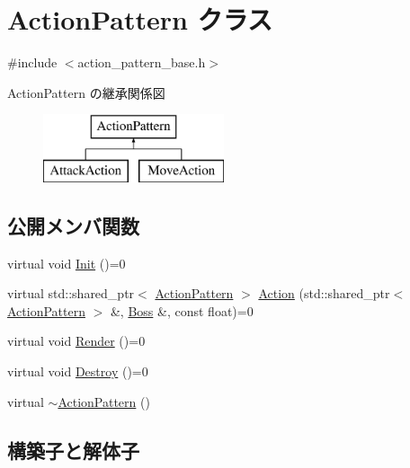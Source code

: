 \hypertarget{class_action_pattern}{}\section{Action\+Pattern クラス}
\label{class_action_pattern}


{\ttfamily \#include $<$action\+\_\+pattern\+\_\+base.\+h$>$}

Action\+Pattern の継承関係図\begin{figure}[H]
\begin{center}
\leavevmode
\includegraphics[height=2.000000cm]{class_action_pattern}
\end{center}
\end{figure}
\subsection*{公開メンバ関数}
\begin{DoxyCompactItemize}
\item 
virtual void \mbox{\hyperlink{class_action_pattern_ac8f2228ca469ce6fe29a9775bf393e0e}{Init}} ()=0
\item 
virtual std\+::shared\+\_\+ptr$<$ \mbox{\hyperlink{class_action_pattern}{Action\+Pattern}} $>$ \mbox{\hyperlink{class_action_pattern_a04c8daf0bf5e263303f7d86aec20eb27}{Action}} (std\+::shared\+\_\+ptr$<$ \mbox{\hyperlink{class_action_pattern}{Action\+Pattern}} $>$ \&, \mbox{\hyperlink{class_boss}{Boss}} \&, const float)=0
\item 
virtual void \mbox{\hyperlink{class_action_pattern_a313199aa5d15b6f9381b916ffe23fe6a}{Render}} ()=0
\item 
virtual void \mbox{\hyperlink{class_action_pattern_a73833df08867c4f4785ddf51344eca47}{Destroy}} ()=0
\item 
virtual \mbox{\hyperlink{class_action_pattern_a0549549b350f2a150835c07cb796131b}{$\sim$\+Action\+Pattern}} ()
\end{DoxyCompactItemize}


\subsection{構築子と解体子}
\mbox{\label{class_action_pattern_a0549549b350f2a150835c07cb796131b}} 
